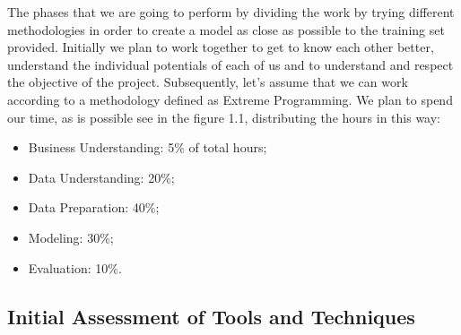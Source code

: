 The phases that we are going to perform by dividing the work by trying different methodologies in order to create a model as close as possible to the training set provided. Initially we plan to work together to get to know each other better, understand the individual potentials of each of us and to understand and respect the objective of the project. Subsequently, let's assume that we can work according to a methodology defined as Extreme Programming.
We plan to spend our time, as is possible see in the figure 1.1, distributing the hours in this way:
\begin{itemize}
\item Business Understanding: 5\% of total hours;
\item Data Understanding: 20\%;
\item Data Preparation: 40\%; 
\item Modeling: 30\%;
\item Evaluation: 10\%.
\end{itemize}

\subsection{Initial Assessment of Tools and
Techniques}
